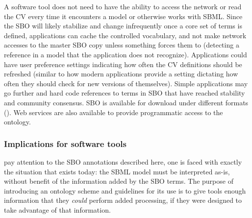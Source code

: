 \begin{blockChanged}

A software tool does not need to have the ability to access the
network or read the CV every time it encounters a model or
otherwise works with SBML.  Since the SBO will likely stabilize
and change infrequently once a core set of terms is defined,
applications can cache the controlled vocabulary, and not make
network accesses to the master SBO copy unless something forces
them to (\eg detecting a reference in a model  that
the application does not recognize).  Applications could have user
preference settings indicating how often the CV definitions should
be refreshed (similar to how modern applications provide a setting
dictating how often they should check for new versions of
themselves).  Simple applications may go further and hard code
references to terms in SBO that have reached stability and
community consensus. SBO is available for download under different
formats (\sboref).  Web services are also available to provide
programmatic access to the ontology.

\end{blockChanged}


\subsubsection{Implications for software tools}

 pay attention to the SBO
annotations described here, one is faced with exactly the
situation that exists today: the SBML model must be interpreted
as-is, without benefit of the information added by the SBO terms.
The purpose of introducing an ontology scheme and guidelines for
its use is to give tools enough information that they \emph{could}
perform added processing, if they were designed to take advantage
of that information.
% 
% 
% 
